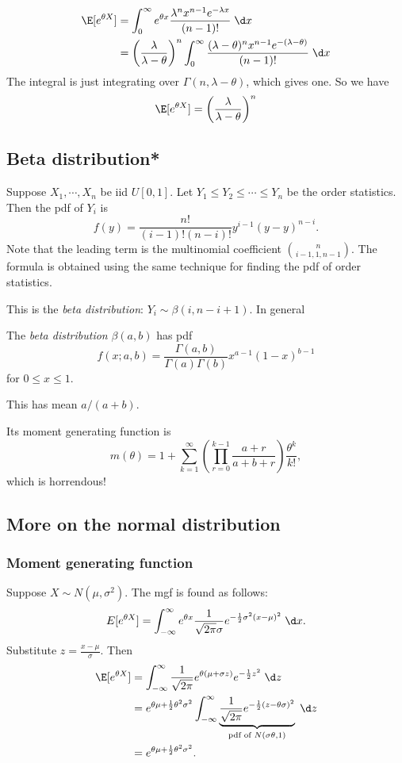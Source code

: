 \documentclass[a4paper]{article}
\begin{document}
\begin{align*}
  \E[e^{\theta X}] &= \int_0^\infty e^{\theta x} \frac{\lambda^n x^{n - 1}e^{-\lambda x}}{(n - 1)!}\;\d x\\
  &= \left(\frac{\lambda}{\lambda - \theta}\right)^n \int_0^\infty \frac{(\lambda - \theta)^n x^{n - 1}e^{-(\lambda - \theta)}}{(n - 1)!}\;\d x\\
\end{align*}
The integral is just integrating over $\Gamma(n, \lambda - \theta)$, which gives one. So we have
\[
  \E[e^{\theta X}]= \left(\frac{\lambda}{\lambda - \theta}\right)^n
\]

\subsection{Beta distribution*}
Suppose $X_1, \cdots, X_n$ be iid $U[0, 1]$. Let $Y_1 \leq Y_2 \leq \cdots \leq Y_n$ be the order statistics. Then the pdf of $Y_i$ is
\[
  f(y) = \frac{n!}{(i - 1)!(n - i)!}y^{i - 1}(y - y)^{n - i}.
\]
Note that the leading term is the multinomial coefficient $\binom{n}{i - 1, 1, n - 1}$. The formula is obtained using the same technique for finding the pdf of order statistics.

This is the \emph{beta distribution}: $Y_i \sim \beta(i, n - i + 1)$. In general
\begin{defi}
  The \emph{beta distribution} $\beta(a, b)$ has pdf
  \[
    f(x; a, b) = \frac{\Gamma(a, b)}{\Gamma(a)\Gamma(b)}x^{a - 1}(1 - x)^{b - 1}
  \]
  for $0 \leq x \leq 1$.

  This has mean $a/(a + b)$.
\end{defi}
Its moment generating function is
\[
  m(\theta) = 1 + \sum_{k = 1}^\infty \left(\prod_{r = 0}^{k - 1}\frac{a + r}{a + b + r}\right)\frac{\theta^k}{k!},
\]
which is horrendous!

\subsection{More on the normal distribution}
\subsubsection{Moment generating function}
Suppose $X\sim N(\mu, \sigma^2)$. The mgf is found as follows:
\[
  E[e^{\theta X}] = \int_{-\infty}^\infty e^{\theta x} \frac{1}{\sqrt{2\pi} \sigma} e^{-\frac{1}{2}\sigma^2 (x - \mu)^2}\;\d x.
\]
Substitute $z = \frac{x - \mu}{\sigma}$. Then
\begin{align*}
  \E[e^{\theta X}] &= \int_{-\infty}^\infty \frac{1}{\sqrt{2\pi}}e^{\theta(\mu + \sigma z)} e^{-\frac{1}{2}z^2}\;\d z\\
  &= e^{\theta\mu + \frac{1}{2}\theta^2\sigma^2}\int_{-\infty}^\infty \underbrace{\frac{1}{\sqrt{2\pi}}e^{-\frac{1}{2}(z - \theta \sigma)^2}}_{\text{pdf of }N(\sigma\theta, 1)}\;\d z\\
  &= e^{\theta\mu + \frac{1}{2}\theta^2\sigma^2}.
\end{align*}
\end{document}
